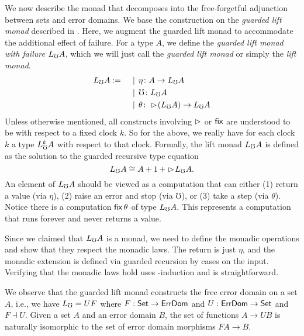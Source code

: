 
We now describe the monad that decomposes into the free-forgetful adjunction
between sets and error domains. We base the construction on the \emph{guarded
lift monad} described in \cite{mogelberg-paviotti2016}. Here, we augment the
guarded lift monad to accommodate the additional effect of failure. For a type
$A$, we define the \emph{guarded lift monad with failure} $L_\mho A$, which we will
just call the \emph{guarded lift monad} or simply the \emph{lift monad}.
%
\begin{align*}
  L_\mho A :=\quad
  &\mathrel{\bf \,\mid\,} \eta \colon A \to L_\mho A \\
  &\mathrel{\bf \,\mid\,} \mho \colon L_\mho A \\
  &\mathrel{\bf \,\mid\,} \theta \colon \vartriangleright \hspace{-0.2em} (L_\mho A) \to L_\mho A
\end{align*}
%
Unless otherwise mentioned, all constructs involving $\vartriangleright$ or $\mathsf{fix}$ are
understood to be with respect to a fixed clock $k$. So for the above, we really
have for each clock $k$ a type $L_\mho^k A$ with respect to that clock.
%
Formally, the lift monad $L_\mho A$ is defined as the solution to the guarded
recursive type equation
%
\[ L_\mho A \cong A + 1\, + \vartriangleright \hspace{-0.2em} L_\mho A. \]
%
An element of $L_\mho A$ should be viewed as a computation that can either (1)
return a value (via $\eta$), (2) raise an error and stop (via $\mho$), or (3)
take a step (via $\theta$).
%
Notice there is a computation $\mathsf{fix}\, \theta$ of type $L_\mho A$. This represents a
computation that runs forever and never returns a value.

Since we claimed that $L_\mho A$ is a monad, we need to define the monadic
operations and show that they respect the monadic laws. The return is just
$\eta$, and the monadic extension is defined via guarded recursion by cases on
the input.
%
%
Verifying that the monadic laws hold uses \lob-induction and is straightforward.

We observe that the guarded lift monad constructs the free error domain on a set
$A$, i.e., we have $L_\mho = UF$ where $F : \mathsf{Set} \to \textsf{ErrDom}$ and $U : \textsf{ErrDom} \to
\mathsf{Set}$ and $F \dashv U$. Given a set $A$ and an error domain $B$, the set of
functions $A \to UB$ is naturally isomorphic to the set of error domain
morphisms $FA \to B$.

